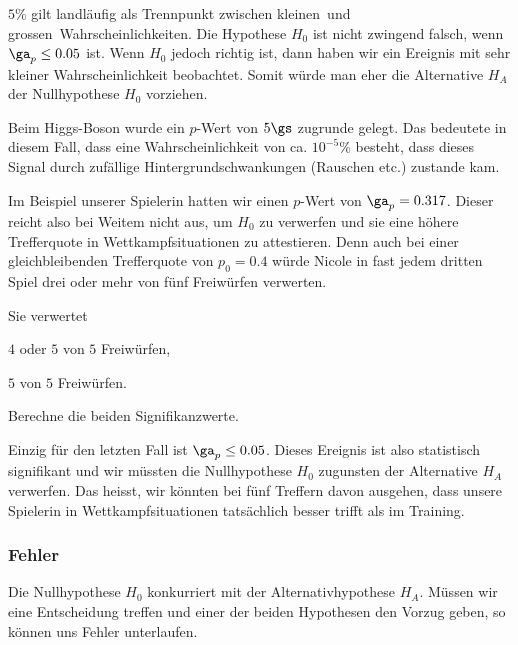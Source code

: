 \documentclass[%
11pt,%
twoside,%
titlepage,%
german,%
headsepline%
]{scrartcl}
\begin{document}
\begin{bem}
$5\%$ gilt landläufig als Trennpunkt zwischen \glqq kleinen\grqq\ und \glqq grossen\grqq\ Wahr\-schein\-lich\-kei\-ten. Die Hypothese $H_0$ ist nicht zwingend falsch, wenn $\ga_p\leq0.05$ ist. Wenn $H_0$ jedoch richtig ist, dann haben wir ein Ereignis mit sehr kleiner Wahrscheinlichkeit beobachtet. Somit würde man eher die Alternative $H_A$ der Nullhypothese $H_0$ vorziehen.
\end{bem}

\begin{bem}
Beim Higgs-Boson wurde ein $p$-Wert von $5\gs$ zugrunde gelegt. Das bedeutete in diesem Fall, dass eine Wahrscheinlichkeit von ca. $10^{-5}$\% besteht, dass dieses Signal durch zufällige Hintergrundschwankungen (Rauschen etc.) zustande kam. 
\end{bem}

Im
Beispiel unserer Spielerin hatten wir einen $p$-Wert von $\ga_p=0.317$. Dieser reicht also bei Weitem nicht aus, um $H_0$ zu verwerfen und sie eine höhere Trefferquote in Wettkampfsituationen zu attestieren. Denn auch bei einer gleichbleibenden Trefferquote von $p_0=0.4$ würde Nicole in fast jedem dritten Spiel drei oder mehr von fünf Freiwürfen verwerten.

\begin{ueb}
Sie verwertet
\begin{enumeratea}
\item $4$ oder $5$ von $5$ Freiwürfen,
\item $5$ von $5$ Freiwürfen.
\end{enumeratea}
Berechne die beiden Signifikanzwerte. 
\end{ueb}

Einzig für den letzten Fall ist $\ga_p\leq0.05$. Dieses Ereignis ist also statistisch signifikant und wir müssten die Nullhypothese $H_0$ zugunsten der Alternative $H_A$ verwerfen. Das heisst, wir könnten bei fünf Treffern davon ausgehen, dass unsere Spielerin in Wettkampfsituationen tatsächlich besser trifft als im Training.

\subsubsection{Fehler}

Die Nullhypothese $H_0$ konkurriert mit der Alternativhypothese $H_A$. Müssen wir eine Entscheidung treffen und einer der beiden Hypothesen den Vorzug geben, so können uns Fehler unterlaufen.
\end{document}
